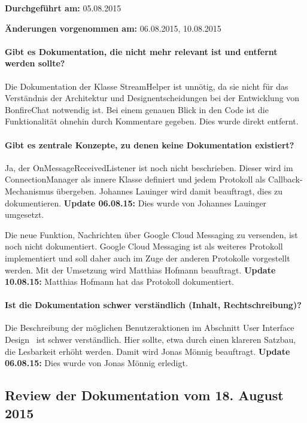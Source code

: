\textbf{Durchgeführt am:} 05.08.2015

\textbf{Änderungen vorgenommen am:} 06.08.2015, 10.08.2015

\paragraph{Gibt es Dokumentation, die nicht mehr relevant ist und entfernt werden sollte?}
Die Dokumentation der Klasse StreamHelper ist unnötig, da sie nicht für das Verständnis der Architektur und Designentscheidungen bei der Entwicklung von BonfireChat notwendig ist. Bei einem genauen Blick in den Code ist die Funktionalität ohnehin durch Kommentare gegeben. Dies wurde direkt entfernt.

\paragraph{Gibt es zentrale Konzepte, zu denen keine Dokumentation existiert?}
Ja, der OnMessageReceivedListener ist noch nicht beschrieben. Dieser wird im ConnectionManager als innere Klasse definiert und jedem Protokoll als Callback-Mechanismus übergeben. Johannes Lauinger wird damit beauftragt, dies zu dokumentieren. \textbf{Update 06.08.15:} Dies wurde von Johannes Lauinger umgesetzt.

Die neue Funktion, Nachrichten über Google Cloud Messaging zu versenden, ist noch nicht dokumentiert. Google Cloud Messaging ist als weiteres Protokoll implementiert und soll daher auch im Zuge der anderen Protokolle vorgestellt werden. Mit der Umsetzung wird Matthias Hofmann beauftragt. \textbf{Update 10.08.15:} Matthias Hofmann hat das Protokoll dokumentiert.

\paragraph{Ist die Dokumentation schwer verständlich (Inhalt, Rechtschreibung)?}
Die Beschreibung der möglichen Benutzeraktionen im Abschnitt \glqq User Interface Design\grqq~ ist schwer verständlich. Hier sollte, etwa durch einen klareren Satzbau, die Lesbarkeit erhöht werden. Damit wird Jonas Mönnig beauftragt. \textbf{Update 06.08.15:} Dies wurde von Jonas Mönnig erledigt.


\subsection{Review der Dokumentation vom 18. August 2015}

